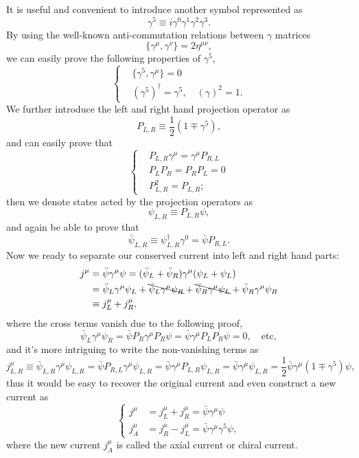 \documentclass{article}
\newcommand{\be}{\begin{equation}}
\newcommand{\ee}{\end{equation}}
\newcommand{\1}{\left}
\newcommand{\2}{\right}
\newcommand{\m}{\mu}
\newcommand{\n}{\nu}
\begin{document}
It is useful and convenient to introduce another symbol represented as
\be
\gamma^5\equiv i\gamma^0\gamma^1\gamma^2\gamma^3.
\ee
By using the well-known anti-commutation relations between $\gamma$ matrices
\be
\{\gamma^\m,\gamma^\n\}=2\eta^{\m\n},
\ee
we can easily prove the following properties of $\gamma^5$,
\be\1\{\begin{split}
&\{\gamma^5,\gamma^\m\}=0\\
&(\gamma^5)^\dagger=\gamma^5, \quad (\gamma)^2=1.
\end{split}\2.\ee
We further introduce the left and right hand projection operator as
\be
P_{L,R}\equiv\frac1 2 (1\mp\gamma^5),
\ee
and can easily prove that
\be\1\{\begin{split}
&P_{L,R}\gamma^\m=\gamma^\m P_{R,L}\\
&P_L P_R=P_R P_L=0\\
&P_{L,R}^2=P_{L,R};
\end{split}\2.\ee
then we denote states acted by the projection operators as
\be
\psi_{L,R}\equiv P_{L,R} \psi,
\ee
and again be able to prove that
\be
\bar\psi_{L,R}\equiv\psi_{L,R}^\dagger\gamma^0=\bar\psi P_{R,L}.
\ee
Now we ready to separate our conserved current into left and right hand parts:
\be\begin{split}
j^\m&=\bar\psi\gamma^\m\psi=(\bar\psi_L+\bar\psi_R)\gamma^\m(\psi_L+\psi_L)\\
&=\bar\psi_L\gamma^\m\psi_L+\bcancel{\bar\psi_L\gamma^\m\psi_R}+\bcancel{\bar\psi_R\gamma^\m\psi_L}+\bar\psi_R\gamma^\m\psi_R\\
&\equiv j^\m_L+j^\m_R,
\end{split}\ee
where the cross terms vanish due to the following proof,
\be
\bar\psi_L\gamma^\m\psi_R=\bar\psi P_R\gamma^\m P_R \psi=\bar\psi \gamma^\m  P_L P_R \psi=0,\quad \text{etc},
\ee
and it's more intriguing to write the non-vanishing terms as
\be
j^\m_{L,R}\equiv \bar\psi_{L,R}\gamma^\m\psi_{L,R}=\bar\psi P_{R,L}\gamma^\m\psi_{L,R}=\bar\psi \gamma^\m P_{L,R} \psi_{L,R}=\bar\psi \gamma^\m \psi_{L,R}=\frac 1 2 \bar\psi \gamma^\m (1\mp\gamma^5)\psi,
\ee
thus it would be easy to recover the original current and even construct a new current as
\be\1\{\begin{split}
j^\m&= j^\m_L+j^\m_R=\bar\psi\gamma^\m\psi\\
j^\m_A&= j^\m_R-j^\m_L=\bar\psi\gamma^\m\gamma^5\psi,
\end{split}\2.\ee
where the new current $j^\m_A$ is called the axial current or chiral current.\\
\end{document}
